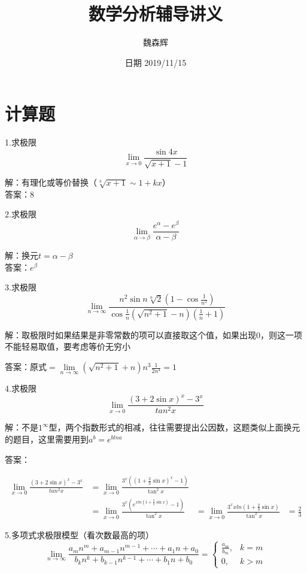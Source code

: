 \documentclass[12pt, a4paper]{ctexart}
\title{数学分析辅导讲义}
\date{日期 2019/11/15}
\author{魏森辉}
\begin{document}
\maketitle{}

\section{计算题}

    \begin{flushleft} %
    1.求极限$$\lim \limits _{x \rightarrow 0} \frac {\sin{4x}}{\sqrt{x+1}-1}$$

    解：有理化或等价替换（$\sqrt[k]{x+1}\sim 1+kx$）\\
    答案：8
    
    2.求极限$$\lim \limits _{\alpha \rightarrow \beta} \frac{e^\alpha - e^\beta}{\alpha - \beta}$$
    
    解：换元$t = \alpha - \beta$
    \\答案：$e^{\beta}$

    3.求极限\[\lim \limits _{n \rightarrow \infty}\frac{{n^2\sin n \sqrt[n]{2}}(1-\cos \frac{1}{n^2})} {\cos \frac{1}{n}(\sqrt{n^2+1}-n)(\frac{1}{n}+1)}\]

    解：取极限时如果结果是非零常数的项可以直接取这个值，如果出现0，则这一项不能轻易取值，要考虑等价无穷小

    答案：原式$=\lim \limits _{n \rightarrow \infty}{ (\sqrt{n^2+1}+n)n^3 \frac{1}{2n^4}}=1$

    4.求极限\[\lim \limits _{x \rightarrow 0} \frac{(3+2 \sin x)^x - 3^x}{tan ^2x}
    \]

    解：不是$1^\infty$型，两个指数形式的相减，往往需要提出公因数，这题类似上面换元的题目，这里需要用到$a^b=e^{blna}$

    答案：

    \[
    \begin{aligned}
    \lim \limits _{x \rightarrow 0} \frac{(3+2 \sin x)^x - 3^x}{tan ^2x} &= \lim \limits _{x \rightarrow 0} {\frac{3^x\left((1+\frac{2}{3}\sin x)^x-1\right)} {\tan^2 x}} \\
    &=\lim \limits _{x \rightarrow 0} \frac{3^x(e^{xln(1+\frac{2}{3}\sin x) }-1)}{\tan^2x} 
    &=\lim \limits _{x \rightarrow 0} \frac{3^xxln(1+\frac{2}{3} \sin x)}{\tan^2 x}
    & = \frac{2}{3}
    \end{aligned}
    \]

    5.多项式求极限模型（看次数最高的项）
    \[
    \lim _{n \rightarrow \infty} \frac{a_{m} n^{m}+a_{m-1} n^{m-1}+\cdots+a_{1} n+a_{0}}{b_{k} n^{k}+b_{k-1} n^{k-1}+\cdots+b_{1} n+b_{0}}=\left\{\begin{array}{ll}{\frac{a_{m}}{b_{m}},} & {k=m} \\ {0,} & {k>m}\end{array}\right.
    \] %


\end{flushleft}
\end{document}
